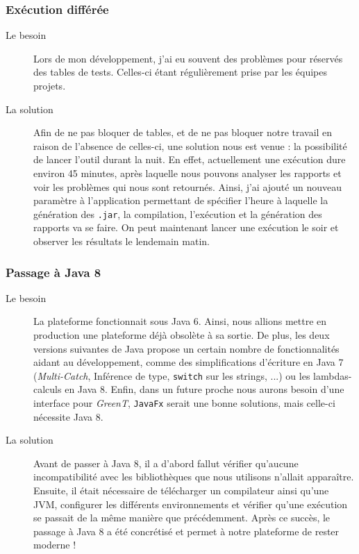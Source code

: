 	\subsubsection{Exécution différée} %
	\begin{description}
		\item[Le besoin] Lors de mon développement, j'ai eu souvent des problèmes pour réservés des tables de tests. Celles-ci étant régulièrement prise par les équipes projets. 
		\item[La solution] Afin de ne pas bloquer de tables, et de ne pas bloquer notre travail en raison de l'absence de celles-ci, une solution nous est venue : la possibilité de lancer l'outil durant la nuit. En effet, actuellement une exécution dure environ 45 minutes, après laquelle nous pouvons analyser les rapports et voir les problèmes qui nous sont retournés. Ainsi, j'ai ajouté un nouveau paramètre à l'application permettant de spécifier l'heure à laquelle la génération des \texttt{.jar}, la compilation, l'exécution et la génération des rapports va se faire. On peut maintenant lancer une exécution le soir et observer les résultats le lendemain matin.
	\end{description}
	
	\subsubsection{Passage à Java 8}
		\begin{description}
			\item[Le besoin] La plateforme fonctionnait sous Java 6. Ainsi, nous allions mettre en production une plateforme déjà obsolète à sa sortie. De plus, les deux versions suivantes de Java propose un certain nombre de fonctionnalités aidant au développement, comme des simplifications d'écriture en Java 7 (\textit{Multi-Catch}, Inférence de type, \texttt{switch} sur les strings, ...) ou les lambdas-calculs en Java 8. Enfin, dans un future proche nous aurons besoin d'une interface pour \textit{GreenT}, \texttt{JavaFx} serait une bonne solutions, mais celle-ci nécessite Java 8.
			\item[La solution] Avant de passer à Java 8, il a d'abord fallut vérifier qu'aucune incompatibilité avec les bibliothèques que nous utilisons n'allait apparaître. Ensuite, il était nécessaire de télécharger un compilateur ainsi qu'une JVM, configurer les différents environnements et vérifier qu'une exécution se passait de la même manière que précédemment. Après ce succès, le passage à Java 8 a été concrétisé et permet à notre plateforme de rester moderne ! 
		\end{description}
		
